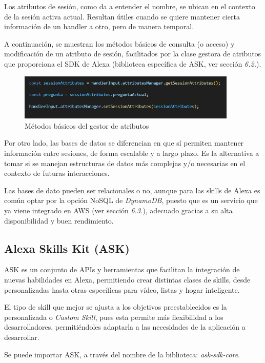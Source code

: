 Los atributos de sesión, como da a entender el nombre, se ubican en el contexto de la sesión activa actual. Resultan útiles cuando se quiere mantener cierta información de un handler a otro, pero de manera temporal.

A continuación, se muestran los métodos básicos de consulta (o acceso) y modificación de un atributo de sesión, facilitados por la clase gestora de atributos que proporciona el SDK de Alexa (biblioteca específica de ASK, ver sección \textit{6.2.}).

\begin{figure}[H]
	\centering
	\includegraphics[width=0.93\textwidth]{imgs/sesion-atrib.jpg}
	\caption{Métodos básicos del gestor de atributos}
	\label{fig:sesion-atrib}
\end{figure}

Por otro lado, las bases de datos se diferencian en que sí permiten mantener información entre sesiones, de forma escalable y a largo plazo. Es la alternativa a tomar si se manejan estructuras de datos más complejas y/o necesarias en el contexto de futuras interacciones.

Las bases de dato pueden ser relacionales o no, aunque para las skills de Alexa es común optar por la opción NoSQL de \textit{DynamoDB}, puesto que es un servicio que ya viene integrado en AWS (ver sección \textit{6.3.}), adecuado gracias a su alta disponibilidad y buen rendimiento.

\subsection{Alexa Skills Kit (ASK)}

ASK es un conjunto de APIs y herramientas que facilitan la integración de nuevas habilidades en Alexa, permitiendo crear distintas clases de skills, desde personalizadas hasta otras específicas para vídeo, listas y hogar inteligente.

El tipo de skill que mejor se ajusta a los objetivos preestablecidos es la personalizada o \textit{Custom Skill}, pues esta permite más flexibilidad a los desarrolladores, permitiéndoles adaptarla a las necesidades de la aplicación a desarrollar.

Se puede importar ASK, a través del nombre de la biblioteca: \textit{ask-sdk-core}.

